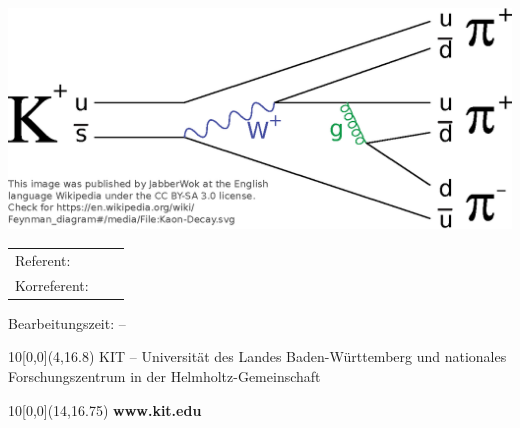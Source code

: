 \begin{titlepage}
	\vspace*{1.5cm}
	\includegraphics[scale=0.7]{./include/frontimage.eps}\\



	\vspace*{1.5cm}
	\Large
	\begin{center}
		\begin{tabular}[ht]{l c l}
			{Referent}: & \hfill  & \thesisreviewerone\\
			{Korreferent}: & \hfill  & \thesisreviewertwo\\
		\end{tabular}
	\end{center}



	\vspace{1cm}
	\begin{center}
		\large{{Bearbeitungszeit}: \thesistimestart \hspace*{0.25cm} -- \hspace*{0.25cm} \thesistimeend}
	\end{center}



	\begin{textblock}{10}[0,0](4,16.8)
		\tiny{KIT -- Universität des Landes Baden-Württemberg und nationales Forschungszentrum in der Helmholtz-Gemeinschaft}
	\end{textblock}
	\begin{textblock}{10}[0,0](14,16.75)
		\large{\textbf{www.kit.edu}}
	\end{textblock}
\end{titlepage}
